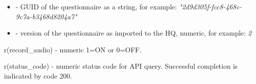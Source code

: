 \paramsheader
\begin{itemize}
    \item {} - GUID of the questionnaire as a string, for example:
          \newline
          \textit{"2d9d305f-fcc8-468c-9c7a-b3468d8204a7"}
    \item {} - version of the questionnaire as imported
          to the HQ, numeric, for example: \textit{2}
\end{itemize}

\savedres
\begin{compactitem}
    \item r(record\_audio) - numeric 1=ON or 0=OFF.
    \item r(status\_code)  - numeric status code for API query. Successful completion is indicated by code 200.
\end{compactitem}
